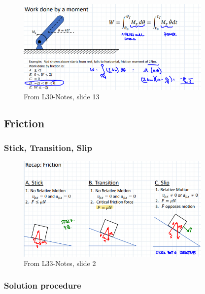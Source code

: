     \subsubsection{}
    
    \begin{figure}[h!]
    \centering \includegraphics[width=0.85\textwidth]{WorkEnergyFigs/WorkMoment.png}
    \caption{From L30-Notes, slide 13}
    \label{fig:WorkMoment}
    \end{figure}
    
\subsection{Friction}
    \subsubsection{Stick, Transition, Slip}
    
    \begin{figure}[h!]
    \centering \includegraphics[width=0.85\textwidth]{WorkEnergyFigs/Friction.png}
    \caption{From L33-Notes, slide 2}
    \label{fig:Friction}
    \end{figure}
    
    \subsubsection{Solution procedure}
    
